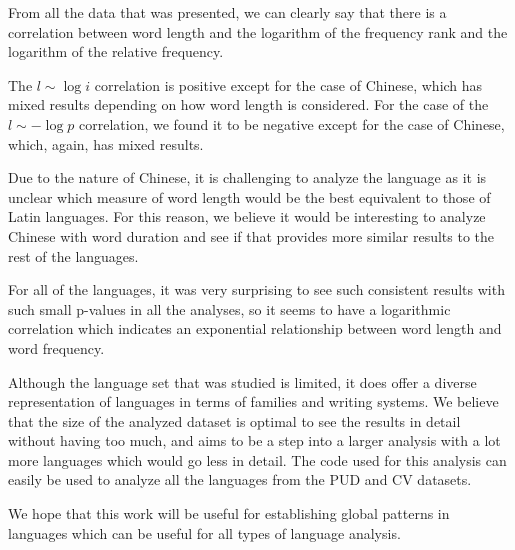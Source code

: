 From all the data that was presented, we can clearly say that there is a correlation between word length and the logarithm of the frequency rank and the logarithm of the relative frequency.

The $l \sim \log i$ correlation is positive except for the case of Chinese, which has mixed results depending on how word length is considered. For the case of the $l \sim -\log p$ correlation, we found it to be negative except for the case of Chinese, which, again, has mixed results.

Due to the nature of Chinese, it is challenging to analyze the language as it is unclear which measure of word length would be the best equivalent to those of Latin languages. For this reason, we believe it would be interesting to analyze Chinese with word duration and see if that provides more similar results to the rest of the languages.

For all of the languages, it was very surprising to see such consistent results with such small p-values in all the analyses, so it seems to have a logarithmic correlation which indicates an exponential relationship between word length and word frequency.

Although the language set that was studied is limited, it does offer a diverse representation of languages in terms of families and writing systems. We believe that the size of the analyzed dataset is optimal to see the results in detail without having too much, and aims to be a step into a larger analysis with a lot more languages which would go less in detail. The code used for this analysis can easily be used to analyze all the languages from the PUD and CV datasets.

We hope that this work will be useful for establishing global patterns in languages which can be useful for all types of language analysis.